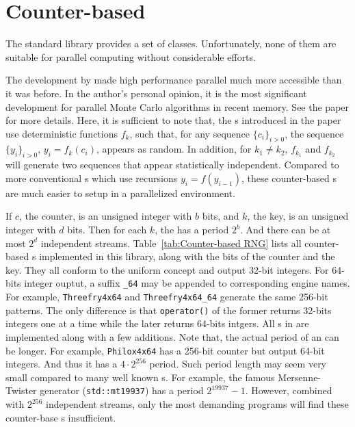 \section{Counter-based \protect\rng}
\label{sec:Counter-based RNG}

The standard library provides a set of \rng classes. Unfortunately, none of
them are suitable for parallel computing without considerable efforts.

The development by \textcite{Salmon:2011um} made high performance parallel \rng
much more accessible than it was before. In the author's personal opinion, it
is the most significant development for parallel Monte Carlo algorithms in
recent memory. See the paper for more details. Here, it is sufficient to
note that, the \rng{}s introduced in the paper use deterministic functions
$f_k$, such that, for any sequence $\{c_i\}_{i>0}$, the sequence
$\{y_i\}_{i>0}$, $y_i = f_k(c_i)$, appears as random. In addition, for $k_1 \ne
k_2$, $f_{k_1}$ and $f_{k_2}$ will generate two sequences that appear
statistically independent. Compared to more conventional \rng{}s which use
recursions $y_i = f(y_{i - 1})$, these counter-based \rng{}s are much easier to
setup in a parallelized environment.

If $c$, the counter, is an unsigned integer with $b$ bits, and $k$, the key, is
an unsigned integer with $d$ bits. Then for each $k$, the \rng has a period
$2^b$. And there can be at most $2^d$ independent streams.
Table~\ref{tab:Counter-based RNG} lists all counter-based \rng{}s implemented
in this library, along with the bits of the counter and the key. They all
conform to the \cppoo uniform \rng concept and output 32-bit integers. For
64-bits integer ouptut, a suffix \verb|_64| may be appended to corresponding
\rng engine names. For example, \verb|Threefry4x64| and \verb|Threefry4x64_64|
generate the same 256-bit patterns. The only difference is that
\verb|operator()| of the former returns 32-bits integers one at a time while
the later returns 64-bits intgers. All \rng{}s in \textcite{Salmon:2011um} are
implemented along with a few additions. Note that, the actual period of an \rng
can be longer. For example, \verb|Philox4x64| has a 256-bit counter but output
64-bit integers. And thus it has a $4 \cdot 2^{256}$ period. Such period length
may seem very small compared to many well known \rng{}s. For example, the
famous Mersenne-Twister generator (\verb|std::mt19937|) has a period $2^{19937}
- 1$. However, combined with $2^{256}$ independent streams, only the most
demanding programs will find these counter-base \rng{}s insufficient.

